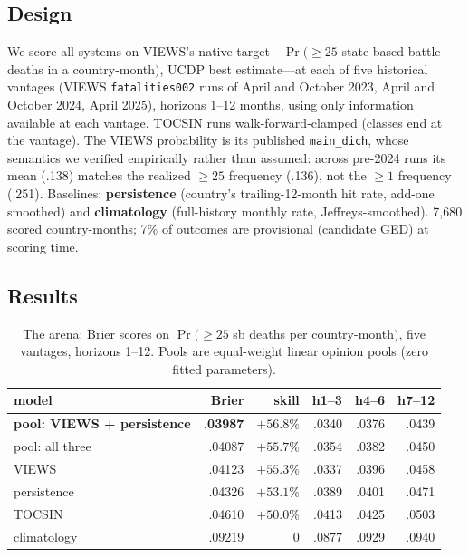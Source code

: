 \documentclass[11pt]{article}
\begin{document}
\subsection{Design}

We score all systems on VIEWS's native target---$\Pr({\geq}25$ state-based
battle deaths in a country-month$)$, UCDP best estimate---at each of five
historical vantages (VIEWS \texttt{fatalities002} runs of April and October
2023, April and October 2024, April 2025), horizons 1--12 months, using only
information available at each vantage. TOCSIN runs walk-forward-clamped
(classes end at the vantage). The VIEWS probability is its published
\texttt{main\_dich}, whose semantics we verified empirically rather than
assumed: across pre-2024 runs its mean (.138) matches the realized ${\geq}25$
frequency (.136), not the ${\geq}1$ frequency (.251). Baselines:
\textbf{persistence} (country's trailing-12-month hit rate, add-one smoothed)
and \textbf{climatology} (full-history monthly rate, Jeffreys-smoothed).
7{,}680 scored country-months; 7\% of outcomes are provisional (candidate
GED) at scoring time.

\subsection{Results}

\begin{table}[t]
\centering
\caption{The arena: Brier scores on $\Pr({\geq}25$ sb deaths per
country-month$)$, five vantages, horizons 1--12. Pools are equal-weight
linear opinion pools (zero fitted parameters).}
\label{tab:arena}
\begin{tabular}{lrrrrr}
\toprule
model & Brier & skill & h1--3 & h4--6 & h7--12 \\
\midrule
\textbf{pool: VIEWS + persistence} & \textbf{.03987} & $+56.8\%$ & .0340 & .0376 & .0439 \\
pool: all three                    & .04087 & $+55.7\%$ & .0354 & .0382 & .0450 \\
VIEWS                              & .04123 & $+55.3\%$ & .0337 & .0396 & .0458 \\
persistence                        & .04326 & $+53.1\%$ & .0389 & .0401 & .0471 \\
TOCSIN                             & .04610 & $+50.0\%$ & .0413 & .0425 & .0503 \\
climatology                        & .09219 & 0         & .0877 & .0929 & .0940 \\
\bottomrule
\end{tabular}
\end{table}
\end{document}

